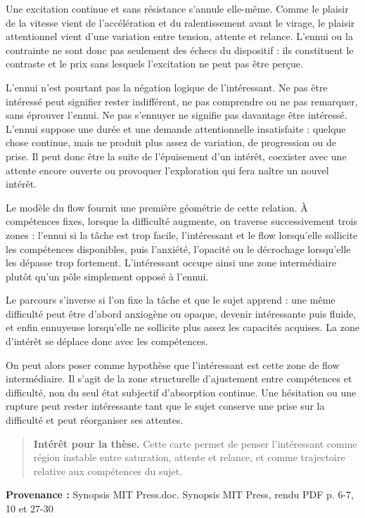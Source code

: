 \documentclass[10pt,a4paper]{article}
\begin{document}
Une excitation continue et sans résistance s'annule elle-même. Comme le plaisir de la vitesse vient de l'accélération et du ralentissement avant le virage, le plaisir attentionnel vient d'une variation entre tension, attente et relance. L'ennui ou la contrainte ne sont donc pas seulement des échecs du dispositif : ils constituent le contraste et le prix sans lesquels l'excitation ne peut pas être perçue.

L'ennui n'est pourtant pas la négation logique de l'intéressant. Ne pas être intéressé peut signifier rester indifférent, ne pas comprendre ou ne pas remarquer, sans éprouver l'ennui. Ne pas s'ennuyer ne signifie pas davantage être intéressé. L'ennui suppose une durée et une demande attentionnelle insatisfaite : quelque chose continue, mais ne produit plus assez de variation, de progression ou de prise. Il peut donc être la suite de l'épuisement d'un intérêt, coexister avec une attente encore ouverte ou provoquer l'exploration qui fera naître un nouvel intérêt.

Le modèle du flow fournit une première géométrie de cette relation. À compétences fixes, lorsque la difficulté augmente, on traverse successivement trois zones : l'ennui si la tâche est trop facile, l'intéressant et le flow lorsqu'elle sollicite les compétences disponibles, puis l'anxiété, l'opacité ou le décrochage lorsqu'elle les dépasse trop fortement. L'intéressant occupe ainsi une zone intermédiaire plutôt qu'un pôle simplement opposé à l'ennui.

Le parcours s'inverse si l'on fixe la tâche et que le sujet apprend : une même difficulté peut être d'abord anxiogène ou opaque, devenir intéressante puis fluide, et enfin ennuyeuse lorsqu'elle ne sollicite plus assez les capacités acquises. La zone d'intérêt se déplace donc avec les compétences.

On peut alors poser comme hypothèse que l'intéressant est cette zone de flow intermédiaire. Il s'agit de la zone structurelle d'ajustement entre compétences et difficulté, non du seul état subjectif d'absorption continue. Une hésitation ou une rupture peut rester intéressante tant que le sujet conserve une prise sur la difficulté et peut réorganiser ses attentes.

\begin{quote}
\textbf{Intérêt pour la thèse.} Cette carte permet de penser l'intéressant comme région instable entre saturation, attente et relance, et comme trajectoire relative aux compétences du sujet.
\end{quote}
{\footnotesize\color{metadata}\textbf{Provenance :} Synopsis MIT Press.doc. Synopsis MIT Press, rendu PDF p. 6-7, 10 et 27-30\par}
\end{document}
